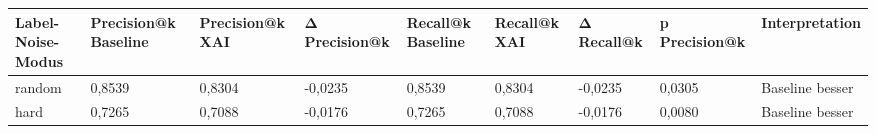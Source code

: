 \begin{tabular}{lllllllll}
\toprule
Label-Noise-Modus & Precision@k Baseline & Precision@k XAI & Δ Precision@k & Recall@k Baseline & Recall@k XAI & Δ Recall@k & p Precision@k & Interpretation \\
\midrule
random & 0,8539 & 0,8304 & -0,0235 & 0,8539 & 0,8304 & -0,0235 & 0,0305 & Baseline besser \\
hard & 0,7265 & 0,7088 & -0,0176 & 0,7265 & 0,7088 & -0,0176 & 0,0080 & Baseline besser \\
\bottomrule
\end{tabular}
